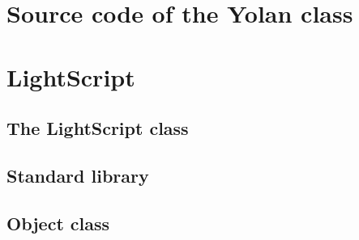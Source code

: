 \documentclass[11pt]{report}
\begin{document}
\newpage
{}



\appendix



\chapter{Source code of the Yolan class}


\chapter{LightScript}
\section{The LightScript class}

\section{Standard library}

\section{Object class}



\newpage
{}
\printindex
\end{document}

